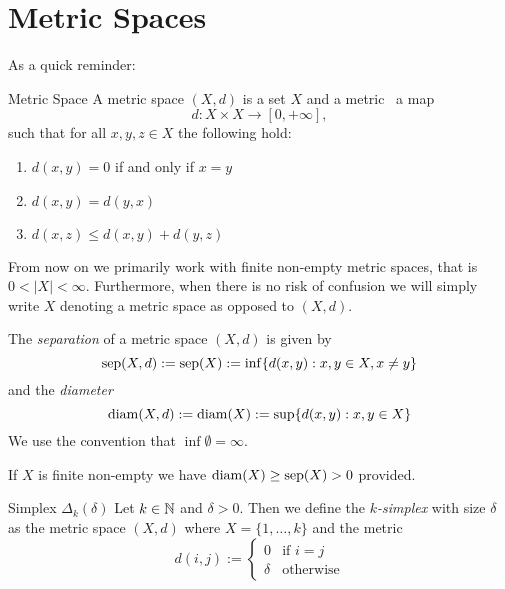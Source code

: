 \section{Metric Spaces}
As a quick reminder:
\begin{definition}{Metric Space}{}
A metric space $(X,d)$ is a set $X$ and a metric \Ie\ a map
\begin{equation*}
d: X \times X \to [0, +\infty],
\end{equation*}
such that for all $x,y,z \in X$ the following hold:
\begin{enumerate}
    \item $d(x,y) = 0$ if and only if $x = y$
    \item $d(x,y) = d(y,x)$
    \item $d(x,z) \leq d(x,y) + d(y,z)$
\end{enumerate}
\end{definition}
From now on we primarily work with finite non-empty metric spaces, that is $0 < |X| < \infty$.
Furthermore, when there is no risk of confusion we will simply write $X$ denoting a metric space as opposed to $(X,d)$.

\begin{definition}{}{}
The \emph{separation} of a metric space $(X,d)$ is given by
\begin{equation*}
\mathrm{sep}(X,d) := \mathrm{sep}(X) := \inf\{d(x,y): x,y \in X, x \neq y\}
\end{equation*}
and the \emph{diameter}
\begin{equation*}
\mathrm{diam}(X,d) := \mathrm{diam}(X) := \sup\{d(x,y): x,y \in X\}
\end{equation*}
We use the convention that $\inf \emptyset = \infty$.
\end{definition}

If $X$ is finite non-empty we have $\mathrm{diam}(X) \geq \mathrm{sep}(X) > 0$ provided.

\begin{definition}{Simplex $\Delta_k(\delta)$}{}
    Let $k \in \mathbb N$ and $\delta > 0$. Then we define the \emph{$k$-simplex} with size $\delta$ as the metric space $(X,d)$ where $X = \{1, \dots, k\}$ and the metric
    $$
    d(i,j) := \begin{cases}
        0 & \text{if } i = j\\
        \delta & \text{otherwise}
    \end{cases}
    $$
\end{definition}